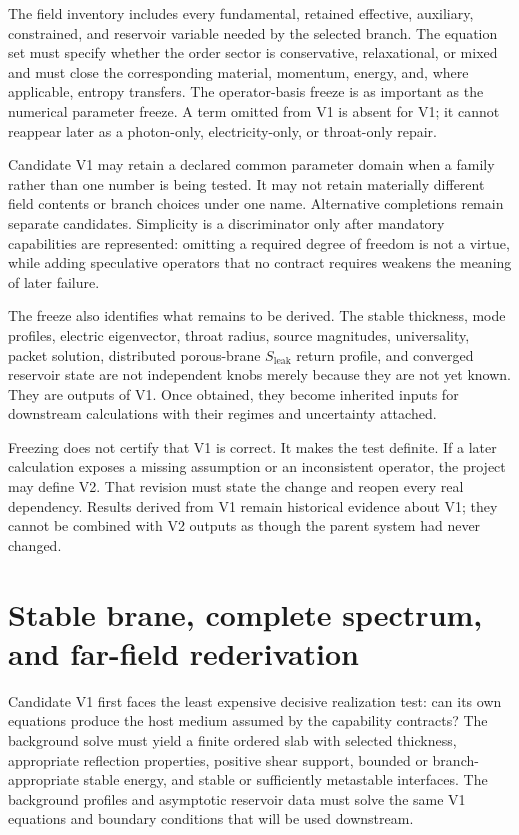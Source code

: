 The field inventory includes every fundamental, retained effective, auxiliary,
constrained, and reservoir variable needed by the selected branch. The equation
set must specify whether the order sector is conservative, relaxational, or
mixed and must close the corresponding material, momentum, energy, and, where
applicable, entropy transfers. The operator-basis freeze is as important as the
numerical parameter freeze. A term omitted from V1 is absent for V1; it cannot
reappear later as a photon-only, electricity-only, or throat-only repair.

Candidate V1 may retain a declared common parameter domain when a family rather
than one number is being tested. It may not retain materially different field
contents or branch choices under one name. Alternative completions remain
separate candidates. Simplicity is a discriminator only after mandatory
capabilities are represented: omitting a required degree of freedom is not a
virtue, while adding speculative operators that no contract requires weakens the
meaning of later failure.

The freeze also identifies what remains to be derived. The stable thickness,
mode profiles, electric eigenvector, throat radius, source magnitudes,
universality, packet solution, distributed porous-brane
\(S_{\mathrm{leak}}\) return profile, and converged reservoir state are not
independent knobs merely because they are not yet known. They are outputs of V1.
Once obtained, they become inherited inputs for downstream calculations with
their regimes and uncertainty attached.

Freezing does not certify that V1 is correct. It makes the test definite. If a
later calculation exposes a missing assumption or an inconsistent operator, the
project may define V2. That revision must state the change and reopen every real
dependency. Results derived from V1 remain historical evidence about V1; they
cannot be combined with V2 outputs as though the parent system had never
changed.

\section{Stable brane, complete spectrum, and far-field rederivation}

Candidate V1 first faces the least expensive decisive realization test: can its
own equations produce the host medium assumed by the capability contracts? The
background solve must yield a finite ordered slab with selected thickness,
appropriate reflection properties, positive shear support, bounded or
branch-appropriate stable energy, and stable or sufficiently metastable
interfaces. The background profiles and asymptotic reservoir data must solve the
same V1 equations and boundary conditions that will be used downstream.

